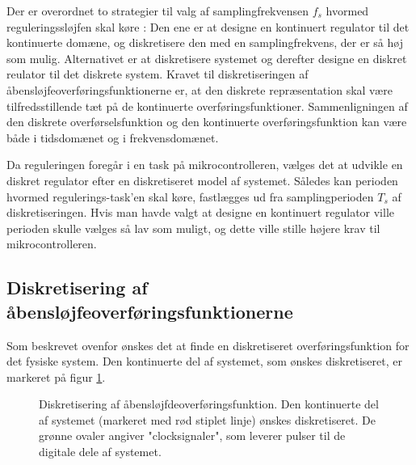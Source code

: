 Der er overordnet to strategier til valg af samplingfrekvensen \(f_s\) hvormed
reguleringssløjfen skal køre \citep[s. 553]{elehandbook}:
Den ene er at designe en kontinuert regulator til det kontinuerte domæne, og diskretisere
den med en samplingfrekvens, der er så høj som mulig.
Alternativet er at diskretisere systemet og derefter designe en diskret reulator til det diskrete system.
Kravet til diskretiseringen af åbensløjfeoverføringsfunktionerne er, at den diskrete repræsentation
skal være tilfredsstillende tæt på de kontinuerte overføringsfunktioner.
Sammenligningen af den diskrete overførselsfunktion og den kontinuerte overføringsfunktion
kan være både i tidsdomænet og i frekvensdomænet.

Da reguleringen foregår i en task på mikrocontrolleren, vælges det
at udvikle en diskret regulator efter en diskretiseret model af systemet.
Således kan perioden hvormed regulerings-task'en skal køre, fastlægges ud fra
samplingperioden \(T_s\) af diskretiseringen. Hvis man havde valgt at designe en kontinuert regulator
ville perioden skulle vælges så lav som muligt, og dette ville stille højere krav
til mikrocontrolleren.

\subsection{Diskretisering af åbensløjfeoverføringsfunktionerne}
Som beskrevet ovenfor ønskes det at finde en diskretiseret overføringsfunktion
for det fysiske system. Den kontinuerte del af systemet, som ønskes diskretiseret,
er markeret på figur \ref{fig:digitalkontroller2}.
\begin{figure}[!th]
\centering
\begin{tikzpicture}[scale=0.8, every node/.style={scale=0.8}, node distance=2.6cm, =>latex']

\end{tikzpicture}
\caption[Diskretisering af åbensløjfeoverføringsfunktion]{Diskretisering af åbensløjfdeoverføringsfunktion.
	Den kontinuerte del af systemet (markeret med rød stiplet linje) ønskes diskretiseret.
	De grønne ovaler angiver "clocksignaler", som leverer pulser til de digitale dele af systemet.}
\label{fig:digitalkontroller2}
\end{figure}

